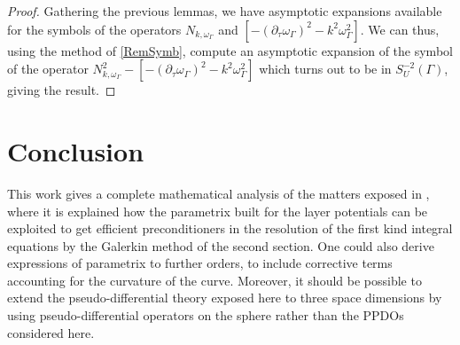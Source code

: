 \documentclass[a4paper]{article}
\begin{document}
\begin{proof}
	Gathering the previous lemmas, we have asymptotic expansions available for the symbols of the operators $N_{k,\omega_\Gamma}$ and $\left[-(\partial_\tau \omega_\Gamma )^2 - k^2\omega_\Gamma^2\right]$. We can thus, using the method of \autoref{RemSymb}, compute an asymptotic expansion of the symbol of the operator $N_{k,\omega_\Gamma}^2 - \left[-(\partial_\tau \omega_\Gamma )^2 - k^2\omega_\Gamma^2\right]$
	which turns out to be in $S^{-2}_U(\Gamma)$, giving the result. 
\end{proof}

\section{Conclusion}

This work gives a complete mathematical analysis of the matters exposed in \cite{alouges2018new}, where it is explained how the parametrix built for the layer potentials can be exploited to get efficient preconditioners in the resolution of the first kind integral equations by the Galerkin method of the second section. One could also derive expressions of parametrix to further orders, to include corrective terms accounting for the curvature of the curve. Moreover, it should be possible to extend the pseudo-differential theory exposed here to three space dimensions by using pseudo-differential operators on the sphere rather than the PPDOs considered here. 

\end{document}

